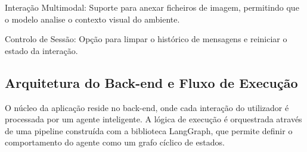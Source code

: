 \documentclass[a4paper,12pt]{scrreprt}
\begin{document}
        Interação Multimodal: Suporte para anexar ficheiros de imagem, permitindo que o modelo analise o contexto visual do ambiente.
        
        Controlo de Sessão: Opção para limpar o histórico de mensagens e reiniciar o estado da interação.

        \subsection{Arquitetura do Back-end e Fluxo de Execução}
        O núcleo da aplicação reside no back-end, onde cada interação do utilizador é processada por um agente inteligente. A lógica de execução é orquestrada através de uma pipeline construída com a biblioteca LangGraph, que permite definir o comportamento do agente como um grafo cíclico de estados.
        
\end{document}
